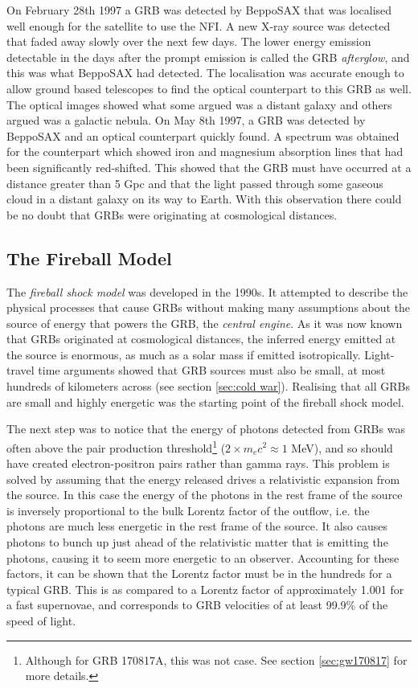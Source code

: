 \documentclass[11pt]{cuthesis}
\begin{document}
On February 28th 1997 a GRB was detected by BeppoSAX that was localised well enough for the satellite to use the NFI. A new X-ray source was detected that faded away slowly over the next few days. The lower energy emission detectable in the days after the prompt emission is called the GRB \textit{afterglow}, and this was what BeppoSAX had detected. The localisation was accurate enough to allow ground based telescopes to find the optical counterpart to this GRB as well. The optical images showed what some argued was a distant galaxy and others argued was a galactic nebula. On May 8th 1997, a GRB was detected by BeppoSAX and an optical counterpart quickly found. A spectrum was obtained for the counterpart which showed iron and magnesium absorption lines that had been significantly red-shifted. This showed that the GRB must have occurred at a distance greater than 5 Gpc and that the light passed through some gaseous cloud in a distant galaxy on its way to Earth. With this observation there could be no doubt that GRBs were originating at cosmological distances.  

\subsection{The Fireball Model} \label{sec: fireball}
The \textit{fireball shock model} was developed in the 1990s. It attempted to describe the physical processes that cause GRBs without making many assumptions about the source of energy that powers the GRB, the \textit{central engine}. As it was now known that GRBs originated at cosmological distances, the inferred energy emitted at the source is enormous, as much as a solar mass if emitted isotropically. Light-travel time arguments showed that GRB sources must also be small, at most hundreds of kilometers across (see section \ref{sec:cold war}). Realising that all GRBs are small and highly energetic was the starting point of the fireball shock model.

The next step was to notice that the energy of photons detected from GRBs was often above the pair production threshold\footnote{Although for GRB 170817A, this was not case. See section \ref{sec:gw170817} for more details.} ($2\times m_e c^2\approx 1$ MeV), and so should have created electron-positron pairs rather than gamma rays. This problem is solved by assuming that the energy released drives a relativistic expansion from the source. In this case the energy of the photons in the rest frame of the source is inversely proportional to the bulk Lorentz factor of the outflow, i.e. the photons are much less energetic in the rest frame of the source. It also causes photons to bunch up just ahead of the relativistic matter that is emitting the photons, causing it to seem more energetic to an observer. Accounting for these factors, it can be shown that the Lorentz factor must be in the hundreds for a typical GRB. This is as compared to a Lorentz factor of approximately 1.001 for a fast supernovae, and corresponds to GRB velocities of at least 99.9\% of the speed of light. 
\end{document}
